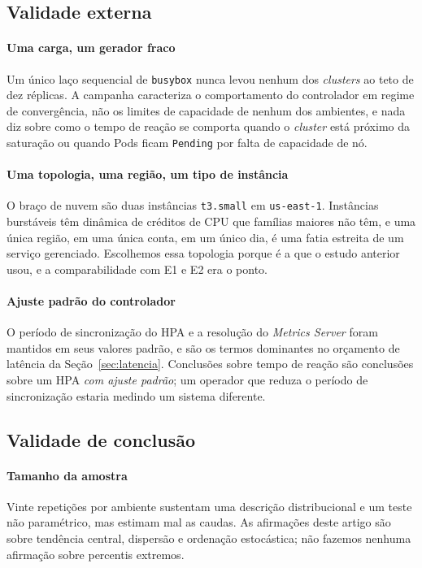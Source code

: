 \documentclass[conference]{IEEEtran}
\begin{document}
\subsection{Validade externa}

\paragraph{Uma carga, um gerador fraco} Um único laço sequencial de
\texttt{busybox} nunca levou nenhum dos \emph{clusters} ao teto de dez réplicas.
A campanha caracteriza o comportamento do controlador em regime de convergência,
não os limites de capacidade de nenhum dos ambientes, e nada diz sobre como o
tempo de reação se comporta quando o \emph{cluster} está próximo da saturação ou
quando Pods ficam \texttt{Pending} por falta de capacidade de nó.

\paragraph{Uma topologia, uma região, um tipo de instância} O braço de nuvem são
duas instâncias \texttt{t3.small} em \texttt{us-east-1}. Instâncias burstáveis
têm dinâmica de créditos de CPU que famílias maiores não têm, e uma única região,
em uma única conta, em um único dia, é uma fatia estreita de um serviço
gerenciado. Escolhemos essa topologia porque é a que o estudo anterior usou, e a
comparabilidade com E1 e E2 era o ponto.

\paragraph{Ajuste padrão do controlador} O período de sincronização do HPA e a
resolução do \emph{Metrics Server} foram mantidos em seus valores padrão, e são
os termos dominantes no orçamento de latência da Seção~\ref{sec:latencia}.
Conclusões sobre tempo de reação são conclusões sobre um HPA \emph{com ajuste
padrão}; um operador que reduza o período de sincronização estaria medindo um
sistema diferente.

\subsection{Validade de conclusão}

\paragraph{Tamanho da amostra} Vinte repetições por ambiente sustentam uma
descrição distribucional e um teste não paramétrico, mas estimam mal as caudas.
As afirmações deste artigo são sobre tendência central, dispersão e ordenação
estocástica; não fazemos nenhuma afirmação sobre percentis extremos.
\end{document}
